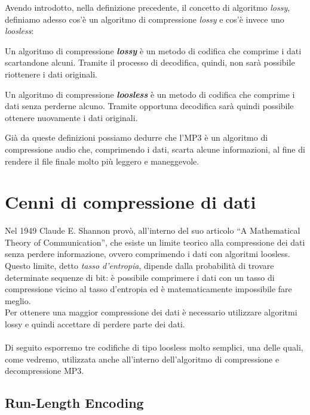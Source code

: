 		Avendo introdotto, nella definizione precedente, il concetto di algoritmo \textit{lossy}, definiamo adesso cos'è un algoritmo di compressione \textit{lossy} e cos'è invece uno \textit{loosless}:
		
		\begin{defi} \label{defi:lossy}
			Un algoritmo di compressione \emph{\textbf{lossy}} è un metodo di codifica che comprime i dati scartandone alcuni. Tramite il processo di decodifica, quindi, non sarà possibile riottenere i dati originali.
		\end{defi}
		
		\begin{defi} \label{defi:loosless}
			Un algoritmo di compressione \emph{\textbf{loosless}} è un metodo di codifica che comprime i dati senza perderne alcuno. Tramite opportuna decodifica sarà quindi possibile ottenere nuovamente i dati originali.
		\end{defi}
		
		Già da queste definizioni possiamo dedurre che l'MP3 è un algoritmo di compressione audio che, comprimendo i dati, scarta alcune informazioni, al fine di rendere il file finale molto più leggero e maneggevole.
		
	\section{Cenni di compressione di dati} \label{sec:cenni_compressione_dati}
		
		Nel 1949 Claude E. Shannon provò, all'interno del suo articolo ``A Mathematical Theory of Communication'', che esiste un limite teorico alla compressione dei dati senza perdere informazione, ovvero comprimendo i dati con algoritmi loosless. Questo limite, detto \textit{tasso d'entropia}, dipende dalla probabilità di trovare determinate sequenze di bit: è possibile comprimere i dati con un tasso di compressione vicino al tasso d'entropia ed è matematicamente impossibile fare meglio.\\
		Per ottenere una maggior compressione dei dati è necessario utilizzare algoritmi lossy e quindi accettare di perdere parte dei dati.\\
		\\
		Di seguito esporremo tre codifiche di tipo loosless molto semplici, una delle quali, come vedremo, utilizzata anche all'interno dell'algoritmo di compressione e decompressione MP3.
		
		\subsection{Run-Length Encoding} \label{subsec:run-length_encoding}
		
